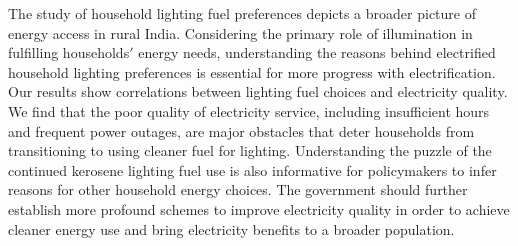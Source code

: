 \documentclass[11pt,english]{article}
\theoremstyle{plain} \newtheorem{claim}{Claim}
\theoremstyle{plain} \newtheorem{prop}{Proposition}
\theoremstyle{plain} \newtheorem{hypo}{Hypothesis}
\begin{document}
The study of household lighting fuel preferences depicts a broader picture of energy access in rural India. Considering the primary role of illumination in fulfilling households$'$ energy needs, understanding the reasons behind electrified household lighting preferences is essential for more progress with electrification. Our results show correlations between lighting fuel choices and electricity quality. We find that the poor quality of electricity service, including insufficient hours and frequent power outages, are major obstacles that deter households from transitioning to using cleaner fuel for lighting. Understanding the puzzle of the continued kerosene lighting fuel use is also informative for policymakers to infer reasons for other household energy choices. The government should further establish more profound schemes to improve electricity quality in order to achieve cleaner energy use and bring electricity benefits to a broader population.

\clearpage



\end{document}
